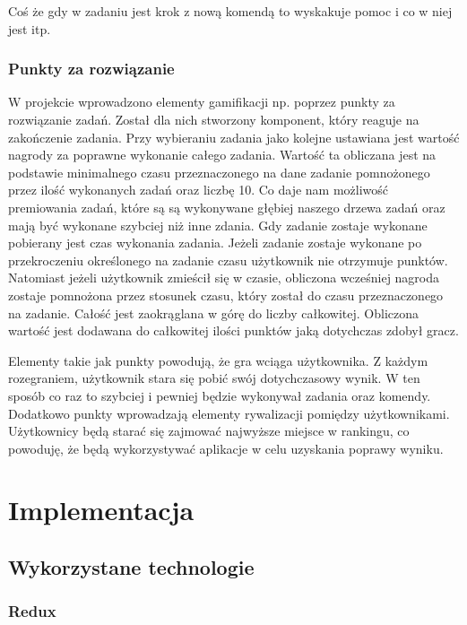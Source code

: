 \documentclass[11pt,a4paper,polish,thesis]{dcsbook}
\begin{document}
	Coś że gdy w zadaniu jest krok z nową komendą to wyskakuje pomoc i co w niej jest itp.
	
	\subsection{Punkty za rozwiązanie}
	W projekcie wprowadzono elementy gamifikacji np. poprzez punkty za rozwiązanie zadań. Został dla nich stworzony komponent, który reaguje na zakończenie zadania. Przy wybieraniu zadania jako kolejne ustawiana jest wartość nagrody za poprawne wykonanie całego zadania. Wartość ta obliczana jest na podstawie minimalnego czasu przeznaczonego na dane zadanie pomnożonego przez ilość wykonanych zadań oraz liczbę 10. Co daje nam możliwość premiowania zadań, które są są wykonywane głębiej naszego drzewa zadań oraz mają być wykonane szybciej niż inne zdania. Gdy zadanie zostaje wykonane pobierany jest czas wykonania zadania. Jeżeli zadanie zostaje wykonane po przekroczeniu określonego na zadanie czasu użytkownik nie otrzymuje punktów. Natomiast jeżeli użytkownik zmieścił się w czasie, obliczona wcześniej nagroda zostaje pomnożona przez stosunek czasu, który został do czasu przeznaczonego na zadanie. Całość jest zaokrąglana w górę do liczby całkowitej. Obliczona wartość jest dodawana do całkowitej ilości punktów jaką dotychczas zdobył gracz. 


	Elementy takie jak punkty powodują, że gra wciąga użytkownika. Z każdym rozegraniem, użytkownik stara się pobić swój dotychczasowy wynik. W ten sposób co raz to szybciej i pewniej będzie wykonywał zadania oraz komendy. Dodatkowo punkty wprowadzają elementy rywalizacji pomiędzy użytkownikami. Użytkownicy będą starać się zajmować najwyższe miejsce w rankingu, co powoduję, że będą wykorzystywać aplikacje w celu uzyskania poprawy wyniku. 

	
	
	\chapter{Implementacja}
	
	\section{Wykorzystane technologie}
	
	\subsection{Redux}
	
\end{document}
